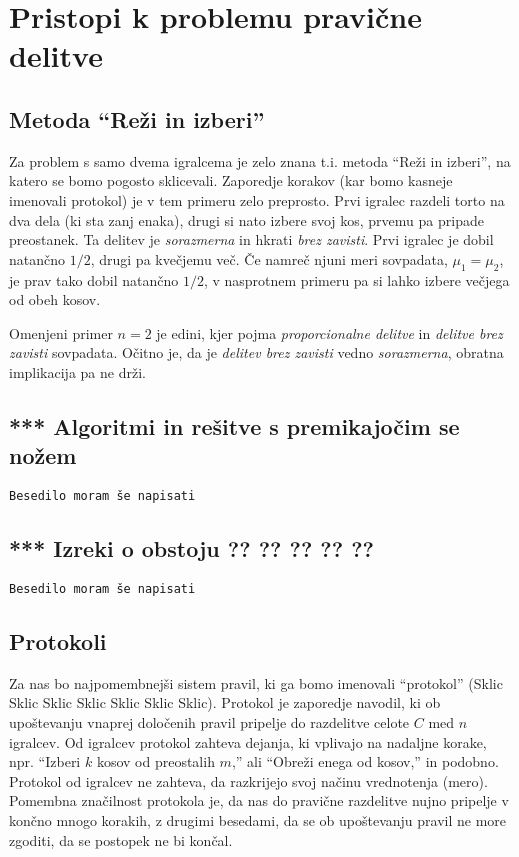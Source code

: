 \documentclass[a4paper,12pt]{article}
\begin{document}
\section{Pristopi k problemu pravične delitve}

\subsection{Metoda ``Reži in izberi''}

Za problem s samo dvema igralcema je zelo znana t.i. metoda ``Reži in izberi'', na katero se bomo pogosto sklicevali. Zaporedje korakov (kar bomo kasneje imenovali protokol) je v tem primeru zelo preprosto. Prvi igralec razdeli torto na dva dela (ki sta zanj enaka), drugi si nato izbere svoj kos, prvemu pa pripade preostanek. Ta delitev je {\em sorazmerna\/} in hkrati {\em brez zavisti\/}. Prvi igralec je dobil natančno $1/2$, drugi pa kvečjemu več. Če namreč njuni meri sovpadata, $\mu_1 = \mu_2$, je prav tako dobil natančno $1/2$, v nasprotnem primeru pa si lahko izbere večjega od obeh kosov.

Omenjeni primer $n = 2$ je edini, kjer pojma {\em proporcionalne delitve\/} in {\em delitve brez zavisti\/} sovpadata. Očitno je, da je {\em delitev brez zavisti\/} vedno {\em sorazmerna\/}, obratna implikacija pa ne drži.

\subsection{*** Algoritmi in rešitve s premikajočim se nožem}

\texttt{Besedilo moram še napisati}

\subsection{*** Izreki o obstoju ?? ?? ?? ?? ??}

\texttt{Besedilo moram še napisati}

\subsection{Protokoli}

Za nas bo najpomembnejši sistem pravil, ki ga bomo imenovali ``protokol'' (Sklic Sklic Sklic Sklic Sklic Sklic Sklic). Protokol je zaporedje navodil, ki ob upoštevanju vnaprej določenih pravil pripelje do razdelitve celote $C$ med $n$ igralcev. Od igralcev protokol zahteva dejanja, ki vplivajo na nadaljne korake, npr. ``Izberi $k$ kosov od preostalih $m$,'' ali ``Obreži enega od kosov,'' in podobno. Protokol od igralcev ne zahteva, da razkrijejo svoj načinu vrednotenja (mero). Pomembna značilnost protokola je, da nas do pravične razdelitve nujno pripelje v končno mnogo korakih, z drugimi besedami, da se ob upoštevanju pravil ne more zgoditi, da se postopek ne bi končal.
\end{document}

